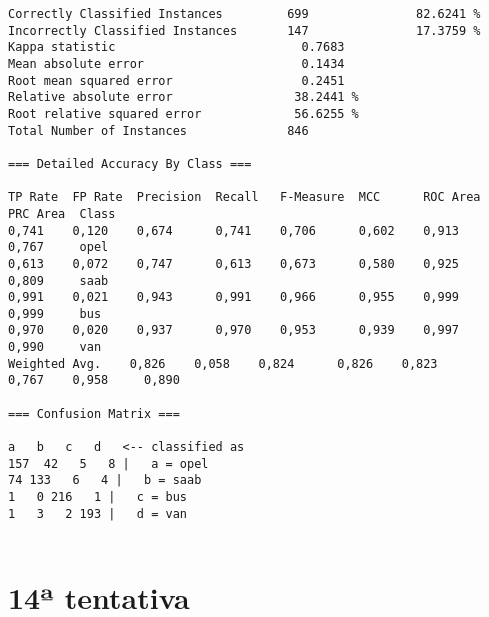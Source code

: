 \documentclass[
	article,			%
	11pt,				%
	oneside,			%
	a4paper,			%
	english,			%
	brazil,				%
	sumario=tradicional
	]{abntex2}
\begin{document}
\begin{lstlisting}
Correctly Classified Instances         699               82.6241 %
Incorrectly Classified Instances       147               17.3759 %
Kappa statistic                          0.7683
Mean absolute error                      0.1434
Root mean squared error                  0.2451
Relative absolute error                 38.2441 %
Root relative squared error             56.6255 %
Total Number of Instances              846     

=== Detailed Accuracy By Class ===

TP Rate  FP Rate  Precision  Recall   F-Measure  MCC      ROC Area  PRC Area  Class
0,741    0,120    0,674      0,741    0,706      0,602    0,913     0,767     opel
0,613    0,072    0,747      0,613    0,673      0,580    0,925     0,809     saab
0,991    0,021    0,943      0,991    0,966      0,955    0,999     0,999     bus
0,970    0,020    0,937      0,970    0,953      0,939    0,997     0,990     van
Weighted Avg.    0,826    0,058    0,824      0,826    0,823      0,767    0,958     0,890     

=== Confusion Matrix ===

a   b   c   d   <-- classified as
157  42   5   8 |   a = opel
74 133   6   4 |   b = saab
1   0 216   1 |   c = bus
1   3   2 193 |   d = van


\end{lstlisting}

\section{14ª tentativa}
\end{document}
